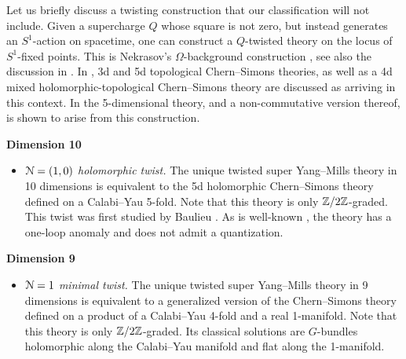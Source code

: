 \documentclass[10pt, oneside]{article}
\begin{document}
\begin{remarknonum}
Let us briefly discuss a twisting construction that our classification will not include.  Given a supercharge $Q$ whose square is not zero, but instead generates an $S^1$-action on spacetime, one can construct a $Q$-twisted theory on the locus of $S^1$-fixed points.  This is Nekrasov's $\Omega$-background construction \cite{Nekrasovthesis,NekrasovSW}, see also the discussion in \cite{CostelloOmega}.  In \cite{Nekrasovthesis}, 3d and 5d topological Chern--Simons theories, as well as a 4d mixed holomorphic-topological Chern--Simons theory are discussed as arriving in this context.  In \cite{CostelloOmega} the 5-dimensional theory, and a non-commutative version thereof, is shown to arise from this construction.
\end{remarknonum}

\textbf{Dimension 10}
\begin{itemize}
 \item \emph{$\mathcal{N}=(1,0)$ holomorphic twist.} The unique twisted super Yang--Mills theory in 10 dimensions is equivalent to the 5d holomorphic Chern--Simons theory defined on a Calabi--Yau 5-fold. Note that this theory is only $\mathbb Z/2\mathbb Z$-graded. This twist was first studied by Baulieu \cite{Baulieu}. As is well-known \cite{GSanomaly, CostelloLiAnomaly}, the theory has a one-loop anomaly and does not admit a quantization.
\end{itemize}

\textbf{Dimension 9}
\begin{itemize}
 \item \emph{$\mathcal{N}=1$ minimal twist.} The unique twisted super Yang--Mills theory in 9 dimensions is equivalent to a generalized version of the Chern--Simons theory defined on a product of a Calabi--Yau 4-fold and a real 1-manifold. Note that this theory is only $\mathbb Z/2\mathbb Z$-graded. Its classical solutions are $G$-bundles holomorphic along the Calabi--Yau manifold and flat along the 1-manifold.
\end{itemize}
\end{document}
